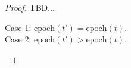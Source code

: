 \documentclass{article}
\begin{document}
\begin{proof}
    TBD...

    \begin{description}
        \item[Case 1: $\text{epoch}(t') = \text{epoch}(t)$.]
        \item[Case 2: $\text{epoch}(t') > \text{epoch}(t)$.]  
    \end{description}
\end{proof}
\end{document}

